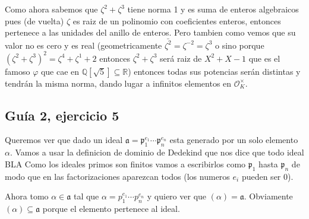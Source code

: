 \documentclass[12pt]{amsart}
\newcommand{\QQ}{\mathbb{Q}}
\newcommand{\RR}{\mathbb{R}}
\newcommand{\pp}{\mathfrak{p}}
\newcommand{\aaa}{\mathfrak{a}}
\newcommand{\OO}{\mathcal{O}}
\theoremstyle{plain}
\begin{document}
Como ahora sabemos que $\zeta^2+\zeta^3$ tiene norma 1 y es suma de 
enteros algebraicos pues (de vuelta) $\zeta$ es raiz de un polinomio con
coeficientes enteros, entonces pertenece a las unidades del anillo de 
enteros. Pero tambien como vemos que su valor no es cero y es real 
(geometricamente $\bar{\zeta^2}=\zeta^{-2} = \zeta^3$ o sino porque 
$(\zeta^2+\zeta^3)^2=\zeta^4+\zeta^1+2$ entonces $\zeta^2+\zeta^3$ 
será raiz de $X^2+X-1$ que es el famoso $\varphi$ que cae en 
$\QQ[\sqrt{5}]\subseteq \RR$) entonces todas sus potencias serán distintas
y tendrán la misma norma, dando lugar a infinitos elementos en 
$\OO_K^\times$.


\subsection*{Guía 2, ejercicio 5}

Queremos ver que dado un ideal $\aaa = \pp_1^{e_1}\cdots\pp_n^{e_n}$ 
esta generado por un solo elemento $\alpha$. Vamos a usar la 
definicion de dominio de Dedekind que nos dice que todo ideal BLA
Como los ideales primos son finitos vamos a escribirlos como $\pp_1$
hasta $\pp_n$ de modo que en las factorizaciones aparezcan todos (los
numeros $e_i$ pueden ser $0$).

Ahora tomo $\alpha \in \aaa$ tal que $\alpha = p_1^{e_1}\cdots 
p_n^{e_n}$ y quiero ver que $(\alpha) = \aaa$. Obviamente $(\alpha) 
\subseteq \aaa$ porque el elemento pertenece al ideal.
\end{document}
